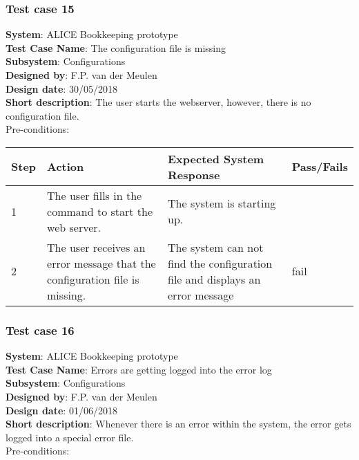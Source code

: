 \subsubsection{Test case 15}
\textbf{System}:  ALICE Bookkeeping prototype \\
\textbf{Test Case Name}:  The configuration file is missing \\
\textbf{Subsystem}:  Configurations \\
\textbf{Designed by}:  F.P. van der Meulen\\
\textbf{Design date}:  30/05/2018\\
\textbf{Short description}: The user starts the webserver, however, there is no configuration file. \\

Pre-conditions: \\

\begin{longtable}{ | p{0.8cm} | p{4.5cm} | p{6cm} | p{1.5cm} |}
\hline
Step & Action & Expected System Response & Pass/Fails  \\ \hline
1 & The user fills in the command to start the web server. & The system is starting up. &  \\ \hline
2 & The user receives an error message that the configuration file is missing. & The system can not find the configuration file and displays an error message & fail\\ \hline
 
\end{longtable}


\subsubsection{Test case 16}
\textbf{System}:  ALICE Bookkeeping prototype \\
\textbf{Test Case Name}:  Errors are getting logged into the error log  \\
\textbf{Subsystem}:  Configurations \\
\textbf{Designed by}:  F.P. van der Meulen\\
\textbf{Design date}:  01/06/2018\\
\textbf{Short description}: Whenever there is an error within the system, the error gets logged into a special error file. \\

Pre-conditions: \\

